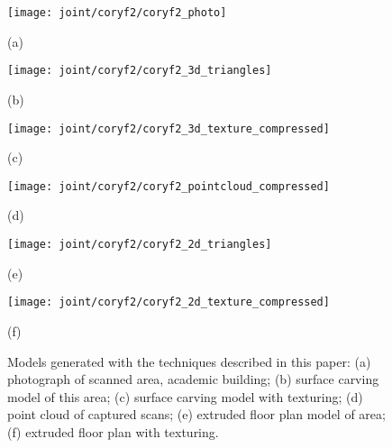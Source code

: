 \documentclass[10pt,twocolumn,twoside]{IEEEtran}
\begin{document}
\begin{figure*}[t]

	\begin{minipage}[t]{0.30\linewidth}
		\centerline{\texttt{[image: joint/coryf2/coryf2\_photo]}}
		\centerline{(a)}\medskip
	\end{minipage}
	\hfill
	\begin{minipage}[t]{0.30\linewidth}
		\centerline{\texttt{[image: joint/coryf2/coryf2\_3d\_triangles]}}
		\centerline{(b)}\medskip
	\end{minipage}
	\hfill
	\begin{minipage}[t]{0.30\linewidth}
		\centerline{\texttt{[image: joint/coryf2/coryf2\_3d\_texture\_compressed]}}
		\centerline{(c)}\medskip
	\end{minipage}
	
	\begin{minipage}[b]{0.30\linewidth}
		\centerline{\texttt{[image: joint/coryf2/coryf2\_pointcloud\_compressed]}}
		\centerline{(d)}\medskip
	\end{minipage}
	\hfill
	\begin{minipage}[b]{0.30\linewidth}
		\centerline{\texttt{[image: joint/coryf2/coryf2\_2d\_triangles]}}
		\centerline{(e)}\medskip
	\end{minipage}
	\hfill
	\begin{minipage}[b]{0.30\linewidth}
		\centerline{\texttt{[image: joint/coryf2/coryf2\_2d\_texture\_compressed]}}
		\centerline{(f)}\medskip
	\end{minipage}
	
	\caption{Models generated with the techniques described in this paper:  (a) photograph of scanned area, academic building; (b) surface carving model of this area; (c) surface carving model with texturing; (d) point cloud of captured scans; (e) extruded floor plan model of area; (f) extruded floor plan with texturing.}
	\label{fig:coryf2}

\end{figure*}
\end{document}
